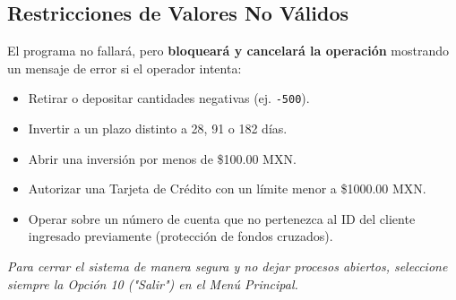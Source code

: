 \documentclass[12pt, letterpaper]{article}
\begin{document}
	\subsection{Restricciones de Valores No Válidos}
	El programa no fallará, pero \textbf{bloqueará y cancelará la operación} mostrando un mensaje de error si el operador intenta:
	\begin{itemize}
		\item Retirar o depositar cantidades negativas (ej. \texttt{-500}).
		\item Invertir a un plazo distinto a 28, 91 o 182 días.
		\item Abrir una inversión por menos de \$100.00 MXN.
		\item Autorizar una Tarjeta de Crédito con un límite menor a \$1000.00 MXN.
		\item Operar sobre un número de cuenta que no pertenezca al ID del cliente ingresado previamente (protección de fondos cruzados).
	\end{itemize}
	
	\vspace{1cm}
	\begin{center}
		\textit{Para cerrar el sistema de manera segura y no dejar procesos abiertos, seleccione siempre la Opción 10 ("Salir") en el Menú Principal.}
	\end{center}
	
\end{document}
